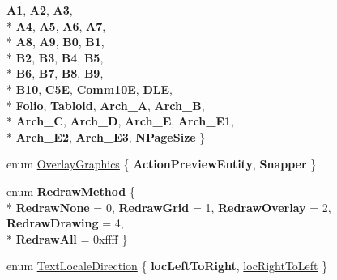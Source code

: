 \begin{DoxyCompactItemize}
$${\bfseries A1}, 
{\bfseries A2}, 
{\bfseries A3}, 
\\*
{\bfseries A4}, 
{\bfseries A5}, 
{\bfseries A6}, 
{\bfseries A7}, 
\\*
{\bfseries A8}, 
{\bfseries A9}, 
{\bfseries B0}, 
{\bfseries B1}, 
\\*
{\bfseries B2}, 
{\bfseries B3}, 
{\bfseries B4}, 
{\bfseries B5}, 
\\*
{\bfseries B6}, 
{\bfseries B7}, 
{\bfseries B8}, 
{\bfseries B9}, 
\\*
{\bfseries B10}, 
{\bfseries C5\-E}, 
{\bfseries Comm10\-E}, 
{\bfseries D\-L\-E}, 
\\*
{\bfseries Folio}, 
{\bfseries Tabloid}, 
{\bfseries Arch\-\_\-\-A}, 
{\bfseries Arch\-\_\-\-B}, 
\\*
{\bfseries Arch\-\_\-\-C}, 
{\bfseries Arch\-\_\-\-D}, 
{\bfseries Arch\-\_\-\-E}, 
{\bfseries Arch\-\_\-\-E1}, 
\\*
{\bfseries Arch\-\_\-\-E2}, 
{\bfseries Arch\-\_\-\-E3}, 
{\bfseries N\-Page\-Size}
 \}
\item 
enum \hyperlink{classRS2_ad08097f2c67307c83fbea0439830f56c}{Overlay\-Graphics} \{ {\bfseries Action\-Preview\-Entity}, 
{\bfseries Snapper}
 \}
\item 
enum {\bfseries Redraw\-Method} \{ \\*
{\bfseries Redraw\-None} = 0, 
{\bfseries Redraw\-Grid} = 1, 
{\bfseries Redraw\-Overlay} = 2, 
{\bfseries Redraw\-Drawing} = 4, 
\\*
{\bfseries Redraw\-All} = 0xffff
 \}
\item 
enum \hyperlink{classRS2_a3dafd8c4ebe0b83d1cb0e889429a7a59}{Text\-Locale\-Direction} \{ {\bfseries loc\-Left\-To\-Right}, 
\hyperlink{classRS2_a3dafd8c4ebe0b83d1cb0e889429a7a59a615bee7ff67a4507319a44f0646d7a32}{loc\-Right\-To\-Left}
 \}
\end{DoxyCompactItemize}
